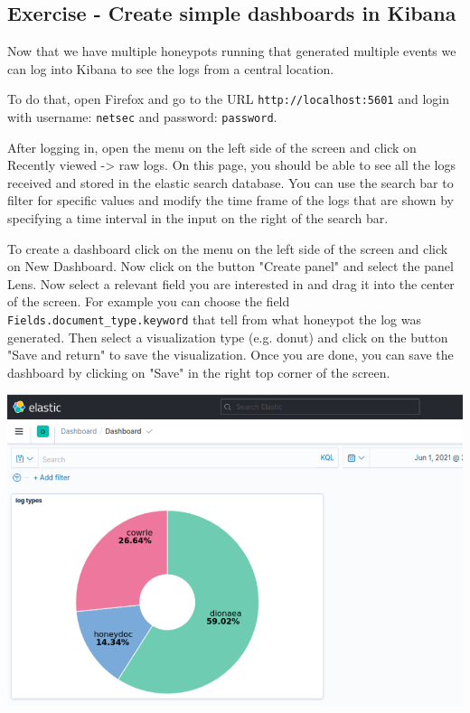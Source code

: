 \documentclass[epsfig,a4paper,11pt,titlepage,oneside,openany]{book}
\begin{document}
\begin{itemize}
\section{Exercise - Create simple dashboards in Kibana}

Now that we have multiple honeypots running that generated multiple events we can log into Kibana to see the logs from a central location.

To do that, open Firefox and go to the URL \texttt{http://localhost:5601} and login with username: \texttt{netsec} and password: \texttt{password}.

After logging in, open the menu on the left side of the screen and click on Recently viewed -> raw logs. On this page, you should be able to see all the logs received and stored in the elastic search database. You can use the search bar to filter for specific values and modify the time frame of the logs that are shown by specifying a time interval in the input on the right of the search bar.

To create a dashboard click on the menu on the left side of the screen and click on New Dashboard. Now click on the button "Create panel" and select the panel Lens. Now select a relevant field you are interested in and drag it into the center of the screen. For example you can choose the field \texttt{Fields.document\_type.keyword} that tell from  what honeypot the log was generated. Then select a visualization type (e.g. donut) and click on the button "Save and return" to save the visualization. Once you are done, you can save the dashboard by clicking on "Save" in the right top corner of the screen.

\begin{center}
\includegraphics[scale=0.35]{kibana}
\end{center}




\end{itemize}
\end{document}
